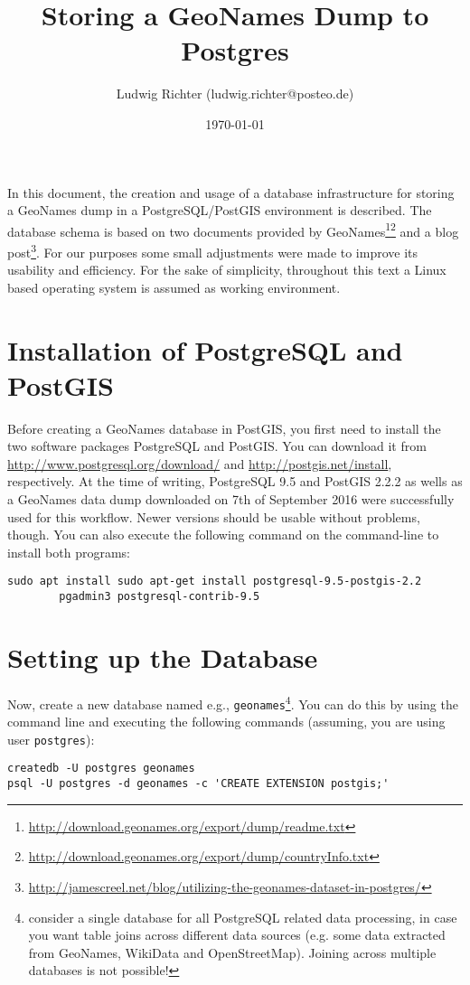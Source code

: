 \documentclass[fontsize=12pt, BCOR=10mm, DIV=14, parskip=true,headings=small]{scrartcl}
\title{Storing a GeoNames Dump to Postgres}
\author{Ludwig Richter (ludwig.richter@posteo.de)}
\date{\today}
\begin{document}
\maketitle

In this document, the creation and usage of a database infrastructure for storing a GeoNames dump in a PostgreSQL/PostGIS environment is described. The database schema is based on two documents provided by GeoNames\footnote{\url{http://download.geonames.org/export/dump/readme.txt}}\multiplefootnoteseparator\footnote{\url{http://download.geonames.org/export/dump/countryInfo.txt}} and a blog post\footnote{\url{http://jamescreel.net/blog/utilizing-the-geonames-dataset-in-postgres/}}. For our purposes some small adjustments were made to improve its usability and efficiency. For the sake of simplicity, throughout this text a Linux based operating system is assumed as working environment.

\section{Installation of PostgreSQL and PostGIS}
Before creating a GeoNames database in PostGIS, you first need to install the two software packages PostgreSQL and PostGIS. You can download it from \url{http://www.postgresql.org/download/} and \url{http://postgis.net/install}, respectively. At the time of writing, PostgreSQL 9.5 and PostGIS 2.2.2 as wells as a GeoNames data dump downloaded on 7th of September 2016 were successfully used for this workflow. Newer versions should be usable without problems, though. You can also execute the following command on the command-line to install both programs:
\begin{verbatim}
sudo apt install sudo apt-get install postgresql-9.5-postgis-2.2 
        pgadmin3 postgresql-contrib-9.5
\end{verbatim}

\section{Setting up the Database}
Now, create a new database named e.g., \texttt{geonames}\footnote{consider a single database for all PostgreSQL related data processing, in case you want table joins across different data sources (e.g. some data extracted from GeoNames, WikiData and OpenStreetMap). Joining across multiple databases is not possible!}. You can do this by using the command line and executing the following commands (assuming, you are using user \texttt{postgres}):
\begin{verbatim}
createdb -U postgres geonames
psql -U postgres -d geonames -c 'CREATE EXTENSION postgis;'
\end{verbatim}
\end{document}
